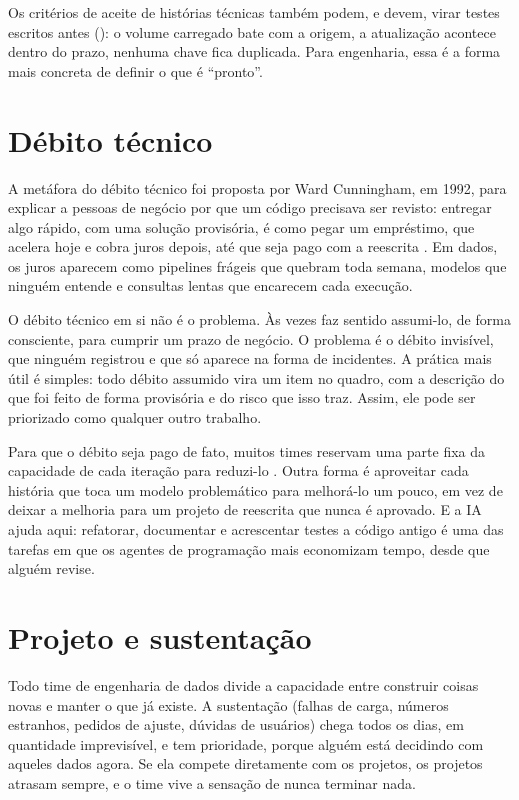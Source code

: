Os critérios de aceite de histórias técnicas também podem, e devem, virar testes escritos antes
(): o volume carregado bate com a origem, a atualização acontece dentro do
prazo, nenhuma chave fica duplicada. Para engenharia, essa é a forma mais concreta de definir
o que é \enquote{pronto}.

\section{Débito técnico}
\label{sec:debito-tecnico}

A metáfora do débito técnico foi proposta por Ward Cunningham, em 1992, para explicar a
pessoas de negócio por que um código precisava ser revisto: entregar algo rápido, com uma
solução provisória, é como pegar um empréstimo, que acelera hoje e cobra juros depois, até que
seja pago com a reescrita \parencite{cunningham1992}. Em dados, os juros aparecem como
pipelines frágeis que quebram toda semana, modelos que ninguém entende e consultas lentas que
encarecem cada execução.

O débito técnico em si não é o problema. Às vezes faz sentido assumi-lo, de forma consciente,
para cumprir um prazo de negócio. O problema é o débito invisível, que ninguém registrou e que
só aparece na forma de incidentes. A prática mais útil é simples: todo débito assumido vira um
item no quadro, com a descrição do que foi feito de forma provisória e do risco que isso traz.
Assim, ele pode ser priorizado como qualquer outro trabalho.

Para que o débito seja pago de fato, muitos times reservam uma parte fixa da capacidade de cada
iteração para reduzi-lo . Outra
forma é aproveitar cada história que toca um modelo problemático para melhorá-lo um pouco, em
vez de deixar a melhoria para um projeto de reescrita que nunca é aprovado. E a IA ajuda
aqui: refatorar, documentar e acrescentar testes a código antigo é uma das tarefas em que os
agentes de programação mais economizam tempo, desde que alguém revise.

\section{Projeto e sustentação}
\label{sec:projeto-sustentacao}

Todo time de engenharia de dados divide a capacidade entre construir coisas novas e manter o
que já existe. A sustentação (falhas de carga, números estranhos, pedidos de ajuste, dúvidas
de usuários) chega todos os dias, em quantidade imprevisível, e tem prioridade, porque alguém
está decidindo com aqueles dados agora. Se ela compete diretamente com os projetos, os projetos
atrasam sempre, e o time vive a sensação de nunca terminar nada.

